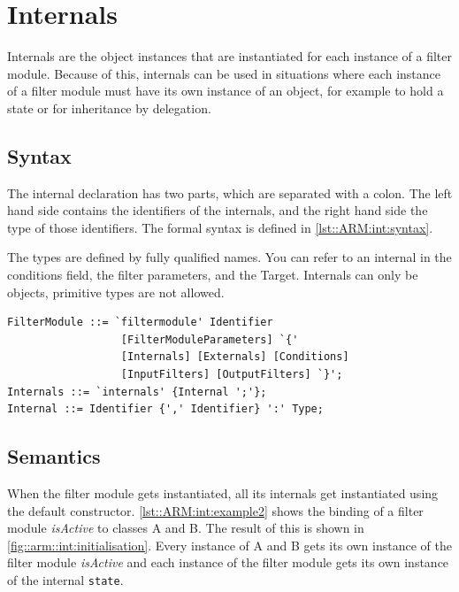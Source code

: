 %
%
%
%
\chapter{Internals}%
Internals are the object instances that are instantiated for each instance of a filter module. 
Because of this, internals can be used in situations where each instance of a filter module must have its own instance of an object, for example to hold a state or for inheritance by delegation.

\section{Syntax}
The internal declaration has two parts, which are separated with a colon. 
The left hand side contains the identifiers of the internals, and the right hand side the type of those identifiers. 
The formal syntax is defined in \autoref{lst::ARM:int:syntax}.

The types are defined by fully qualified names.
You can refer to an internal in the conditions field, the filter parameters, and the Target.
Internals can only be objects, primitive types are not allowed.
\begin{lstlisting}[caption = {Internals syntax}, label = lst::ARM:int:syntax,
style = listing, language = ebnf, float = tpb]
FilterModule ::= `filtermodule' Identifier 
                  [FilterModuleParameters] `{'
                  [Internals] [Externals] [Conditions]
                  [InputFilters] [OutputFilters] `}';
Internals ::= `internals' {Internal ';'};
Internal ::= Identifier {',' Identifier} ':' Type;
\end{lstlisting}

\section{Semantics}
When the filter module gets instantiated, all its internals get instantiated using the default constructor.
\autoref{lst::ARM:int:example2} shows the binding of a filter module \emph{isActive} to classes A and B. 
The result of this is shown in \autoref{fig::arm::int:initialisation}.
Every instance of A and B gets its own instance of the filter module \emph{isActive} and each instance of the filter module gets its own instance of the internal \lstinline!state!.


